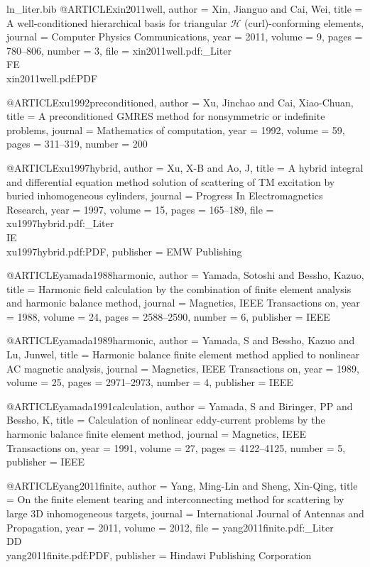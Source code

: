 \begin{filecontents*}{ln_liter.bib}
@ARTICLE{xin2011well,
  author = {Xin, Jianguo and Cai, Wei},
  title = {A well-conditioned hierarchical basis for triangular $\mathcal{H}$
	(curl)-conforming elements},
  journal = {Computer Physics Communications},
  year = {2011},
  volume = {9},
  pages = {780--806},
  number = {3},
  file = {xin2011well.pdf:_Liter\\FE\\xin2011well.pdf:PDF}
}

@ARTICLE{xu1992preconditioned,
  author = {Xu, Jinchao and Cai, Xiao-Chuan},
  title = {A preconditioned {GMRES} method for nonsymmetric or indefinite problems},
  journal = {Mathematics of computation},
  year = {1992},
  volume = {59},
  pages = {311--319},
  number = {200}
}

@ARTICLE{xu1997hybrid,
  author = {Xu, X-B and Ao, J},
  title = {A hybrid integral and differential equation method solution of scattering
	of TM excitation by buried inhomogeneous cylinders},
  journal = {Progress In Electromagnetics Research},
  year = {1997},
  volume = {15},
  pages = {165--189},
  file = {xu1997hybrid.pdf:_Liter\\IE\\xu1997hybrid.pdf:PDF},
  publisher = {EMW Publishing}
}

@ARTICLE{yamada1988harmonic,
  author = {Yamada, Sotoshi and Bessho, Kazuo},
  title = {Harmonic field calculation by the combination of finite element analysis
	and harmonic balance method},
  journal = {Magnetics, IEEE Transactions on},
  year = {1988},
  volume = {24},
  pages = {2588--2590},
  number = {6},
  publisher = {IEEE}
}

@ARTICLE{yamada1989harmonic,
  author = {Yamada, S and Bessho, Kazuo and Lu, Junwel},
  title = {Harmonic balance finite element method applied to nonlinear {AC}
	magnetic analysis},
  journal = {Magnetics, IEEE Transactions on},
  year = {1989},
  volume = {25},
  pages = {2971--2973},
  number = {4},
  publisher = {IEEE}
}

@ARTICLE{yamada1991calculation,
  author = {Yamada, S and Biringer, PP and Bessho, K},
  title = {Calculation of nonlinear eddy-current problems by the harmonic balance
	finite element method},
  journal = {Magnetics, IEEE Transactions on},
  year = {1991},
  volume = {27},
  pages = {4122--4125},
  number = {5},
  publisher = {IEEE}
}

@ARTICLE{yang2011finite,
  author = {Yang, Ming-Lin and Sheng, Xin-Qing},
  title = {On the finite element tearing and interconnecting method for scattering
	by large {3D} inhomogeneous targets},
  journal = {International Journal of Antennas and Propagation},
  year = {2011},
  volume = {2012},
  file = {yang2011finite.pdf:_Liter\\DD\\yang2011finite.pdf:PDF},
  publisher = {Hindawi Publishing Corporation}
}


\end{filecontents*}

